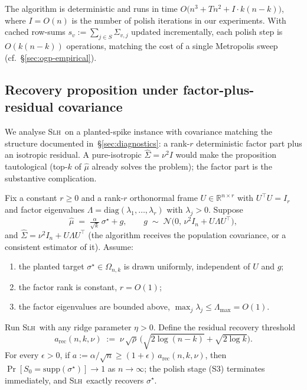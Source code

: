 \medskip
The algorithm is deterministic and runs in time
$O\big(n^3 + T n^2 + I\cdot k(n-k)\big)$, where $I = O(n)$ is the
number of polish iterations in our experiments. With cached row-sums
$s_v := \sum_{j\in S}\hat\Sigma_{v,j}$ updated incrementally, each polish step is $O(k(n-k))$
operations, matching the cost of a single Metropolis sweep (cf.\ \S\ref{sec:ogp-empirical}).

\subsection{Recovery proposition under factor-plus-residual covariance}\label{sec:slh-recovery}

We analyse \textsc{Slh}\ on a planted-spike instance with covariance matching the
structure documented in~\S\ref{sec:diagnostics}: a rank-$r$ deterministic factor part
plus an isotropic residual. A pure-isotropic $\hat\Sigma=\nu^2 I$ would make the
proposition tautological (top-$k$ of $\hat\mu$ already solves the problem); the factor
part is the substantive complication.

\begin{theorem}
\label{prop:slh-recovery}
Fix a constant $r\ge 0$ and a rank-$r$ orthonormal frame $U\in\mathbb R^{n\times r}$ with
$U^\top U = I_r$ and factor eigenvalues $\Lambda=\mathrm{diag}(\lambda_1,\dots,\lambda_r)$
with $\lambda_j>0$. Suppose
\begin{equation}\label{eq:factor-model}
  \hat\mu \;=\; \tfrac{\alpha}{\sqrt k}\,\sigma^\star + g, \qquad
  g \;\sim\; \mathcal N\bigl(0,\,\nu^2 I_n + U\Lambda U^\top\bigr),
\end{equation}
and $\hat\Sigma = \nu^2 I_n + U\Lambda U^\top$ (the algorithm receives the population
covariance, or a consistent estimator of it). Assume:
\begin{enumerate}\itemsep=2pt
\item the planted target $\sigma^\star\in\Omega_{n,k}$ is drawn uniformly, independent of
$U$ and $g$;
\item the factor rank is constant, $r=O(1)$;
\item the factor eigenvalues are bounded above, $\max_j\lambda_j\le \Lambda_{\max}=O(1)$.
\end{enumerate}
Run \textsc{Slh}\ with any ridge parameter $\eta>0$. Define the residual recovery threshold
\begin{equation}\label{eq:a-rec-factor}
  a_{\mathrm{rec}}(n,k,\nu)
  \;:=\; \nu\,\sqrt{\rho}\,\bigl(\sqrt{2\log(n-k)}+\sqrt{2\log k}\bigr).
\end{equation}
For every $\epsilon>0$, if $a := \alpha/\sqrt n \ge (1+\epsilon)\, a_{\mathrm{rec}}(n,k,\nu)$,
then $\Pr[S_0 = \mathrm{supp}(\sigma^\star)] \to 1$ as $n\to\infty$; the polish stage
(S3) terminates immediately, and \textsc{Slh}\ exactly recovers $\sigma^\star$.
\end{theorem}

